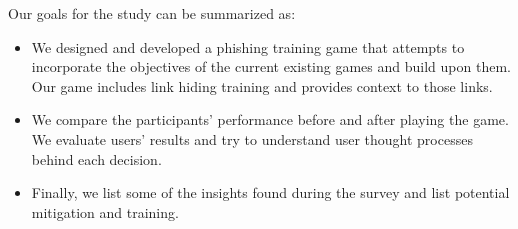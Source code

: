 \begin{table}[!ht]

    \caption{Different type of training games and their main objectives}
    \label{tab:game-type}
\end{table}

Our goals for the study can be summarized as:

\begin{itemize}
    \item We designed and developed a phishing training game that attempts to incorporate the objectives of the current existing games and build upon them. Our game includes link hiding training and provides context to those links.
    \item We compare the participants' performance before and after playing the game. We evaluate users' results and try to understand user thought processes behind each decision.
    \item Finally, we list some of the insights found during the survey and list potential mitigation and training.
\end{itemize}



